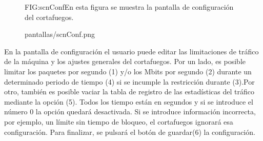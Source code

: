 \begin{figure}[Pantalla de configuración]{FIG:scnConf}{En esta figura se muestra la pantalla de configuración del cortafuegos.}
  \begin{image}{}{}{pantallas/scnConf.png}
  \end{image}
\end{figure}

En la pantalla de configuración el usuario puede editar las limitaciones de tráfico de la máquina y los ajustes generales del cortafuegos. Por un lado, es posible limitar los paquetes por segundo (1) y/o los Mbits por segundo (2) durante un determinado periodo de tiempo (4) si se incumple la restricción durante (3).Por otro, también es posible vaciar la tabla de registro de las estadísticas del tráfico mediante la opción (5). Todos los tiempo están en segundos y si se introduce el número 0 la opción quedará desactivada. Si se introduce información incorrecta, por ejemplo, un límite sin tiempo de bloqueo, el cortafuegos ignorará esa configuración. Para finalizar, se pulsará el botón de guardar(6) la configuración. 